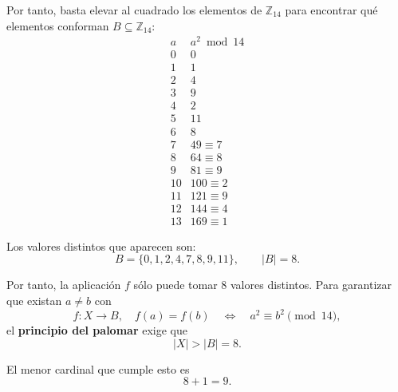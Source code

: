 \documentclass[a4paper,12pt]{article}
\begin{document}
\begin{ejercicio}[title=Ejercicio 41 (⋆)]

Por tanto, basta elevar al cuadrado los elementos de $\mathbb{Z}_{14}$ para encontrar qué elementos conforman $B \subseteq \mathbb{Z}_{14}$:
\[
\begin{array}{c|c}
a & a^2 \bmod 14 \\ \hline
0 & 0\\
1 & 1\\
2 & 4\\
3 & 9\\
4 & 2\\
5 & 11\\
6 & 8\\
7 & 49\equiv 7\\
8 & 64\equiv 8\\
9 & 81\equiv 9\\
10 & 100\equiv 2\\
11 & 121\equiv 9\\
12 & 144\equiv 4\\
13 & 169\equiv 1
\end{array}
\]

Los valores distintos que aparecen son:
\[
B=\{0,1,2,4,7,8,9,11\},
\qquad |B|=8.
\]

Por tanto, la aplicación $f$ sólo puede tomar $8$ valores distintos. Para garantizar que existan $a\ne b$ con
\[
f:X\to B, \quad f(a)=f(b) \quad\Longleftrightarrow\quad a^2\equiv b^2\pmod{14},
\]
el \textbf{principio del palomar} exige que
\[
|X|>|B| =8.
\]

El menor cardinal que cumple esto es
\[
8+1=\boxed{9}.
\]

\end{ejercicio}
\end{document}
